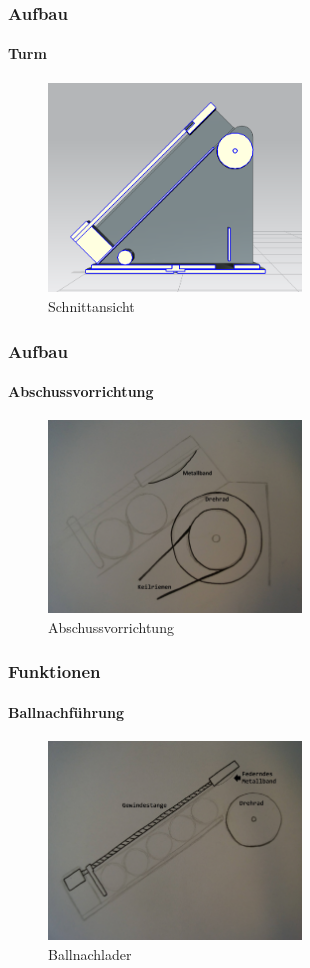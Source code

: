 \begin{frame}
	\frametitle{Aufbau\hfill{}\footnotesize \group}
	\framesubtitle{Turm}
		\begin{figure}
			\centering
			\includegraphics[width=0.6\textwidth]{../../fig/Schnittansicht.png}
			\caption{Schnittansicht}
		\end{figure}
\end{frame}

\begin{frame}
	\frametitle{Aufbau\hfill{}\footnotesize \group}
	\framesubtitle{Abschussvorrichtung}
		\begin{figure}
			\centering
			\includegraphics[width=0.6\textwidth]{../../fig/Drehrad.jpg}
			\caption{Abschussvorrichtung}
		\end{figure}
\end{frame}

\begin{frame}
	\frametitle{Funktionen\hfill{}\footnotesize \group}
	\framesubtitle{Ballnachführung}
		\begin{figure}
			\centering
			\includegraphics[width=0.6\textwidth]{../../fig/Ballnachlader.jpg}
			\caption{Ballnachlader}
		\end{figure}
\end{frame}
